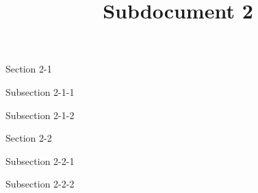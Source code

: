 \documentclass{article}
\title{Subdocument 2}
\date{}
\begin{document}
    \maketitle
    \tableofcontents

    \begin{section}{Section 2-1}
        \begin{subsection}{Subsection 2-1-1}
        \end{subsection}
        \begin{subsection}{Subsection 2-1-2}
        \end{subsection}
    \end{section}
    
    \begin{section}{Section 2-2}
        \begin{subsection}{Subsection 2-2-1}
        \end{subsection}
        \begin{subsection}{Subsection 2-2-2}
        \end{subsection}
    \end{section}
\end{document}
